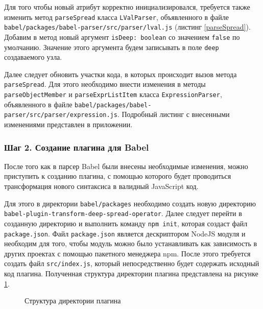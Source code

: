\documentclass[14pt, a4paper]{article}
\def\code#1{\texttt{#1}} %
\begin{document}
Для того чтобы новый атрибут корректно инициализировался, требуется также изменить метод \code{parseSpread} класса
\code{LValParser}, объявленного в файле \code{babel/packages/babel-parser/src/parser/lval.js} (листинг \ref{parseSpread}). 
Добавим в метод новый аргумент \code{isDeep: boolean} со значением \code{false} по умолчанию. Значение этого аргумента будем записывать 
в поле \code{deep} создаваемого узла.



Далее следует обновить участки кода, в которых происходит вызов метода \code{parseSpread}. Для этого
необходимо внести изменения в методы \code{parseObjectMember} и \code{parseExprListItem} класса \code{ExpressionParser},
объявленного в файле \code{babel/packages/babel-parser/src/parser/expression.js}. Подробный листинг с внесенными изменениями представлен в приложении.


\subsubsection*{Шаг 2. Создание плагина для Babel}
После того как в парсер Babel были внесены необходимые изменения, можно приступить к созданию плагина,
с помощью которого будет проводиться трансформация нового синтаксиса в валидный JavaScript код.

Для этого в директории \code{babel/packages} необходимо создать новую директорию \code{babel-plugin-transform-deep-spread-operator}.
Далее следует перейти в созданную директорию и выполнить команду \code{npm init}, которая создаст
файл \code{package.json}. Файл \code{package.json} является дескриптором NodeJS модуля и необходим 
для того, чтобы модуль можно было устанавливать как зависимость в других проектах с помощью пакетного
менеджера npm. После этого требуется создать файл \code{src/index.js}, который непосредственно будет 
содержать исходный код плагина. Полученная структура директории плагина представлена на рисунке \ref{babel_plugin_dirs}.

\begin{figure}[h!]
  \centering
  \caption{Структура директории плагина}
  \label{babel_plugin_dirs}
\end{figure}
\end{document}
